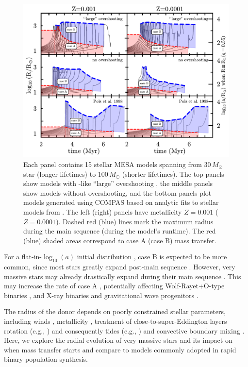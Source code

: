 \documentclass[twocolumn]{aastex631}
\begin{document}
\begin{figure}[htbp]
  \centering
  \includegraphics[width=1.0\textwidth]{radii}
  \caption{Each panel contains 15 stellar \textsc{MESA} models
    spanning from $30 \, M_{\odot}$ star (longer lifetimes) to
    $100 \, M_{\odot}$ (shorter lifetimes). The top panels show models
    with \cite{brott:11}-like ``large'' overshooting
    \citep{claret:18}, the middle panels show models without
    overshooting, and the bottom panels plot models generated using
    \textsc{COMPAS} based on analytic fits to stellar models from
    \cite{pols:98}. The left (right) panels have metallicity $Z=0.001$
    ($Z=0.0001$). Dashed red (blue) lines mark the maximum radius
    during the main sequence (during the model's runtime). The red
    (blue) shaded areas correspond to case A (case B) mass transfer.}
  \label{fig:radii}
\end{figure}

For a flat-in-$\log_{10}(a)$ initial distribution \citep{opik:24},
case B is expected to be more common, since most stars greatly expand
post-main sequence \citep[e.g.,][]{vandenheuvel:69}. However, very
massive stars may already drastically expand during their main
sequence \citep[e.g.,][]{sanyal:15, jiang:15}. This may increase the
rate of case A \citep{demink:08}, potentially affecting
Wolf-Rayet+O-type binaries \citep[e.g.,][]{nuijten:24}, and X-ray
binaries and gravitational wave progenitors
\citep[e.g.,][]{mandel:22}.

The radius of the donor depends on poorly constrained stellar
parameters, including winds \citep{renzo:17, josiek:24}, metallicity
\citep{xin:22}, treatment of close-to-super-Eddington layers
\citep[e.g.,][]{joss:73, jiang:15} rotation (e.g.,
\citealt{maeder:00}) and consequently tides (e.g., \citealt{fabry:22})
and convective boundary mixing \citep{anders:23, johnston:24}. Here,
we explore the radial evolution of very massive stars and its impact
on when mass transfer starts and compare to models commonly adopted in
rapid binary population synthesis.
\end{document}
